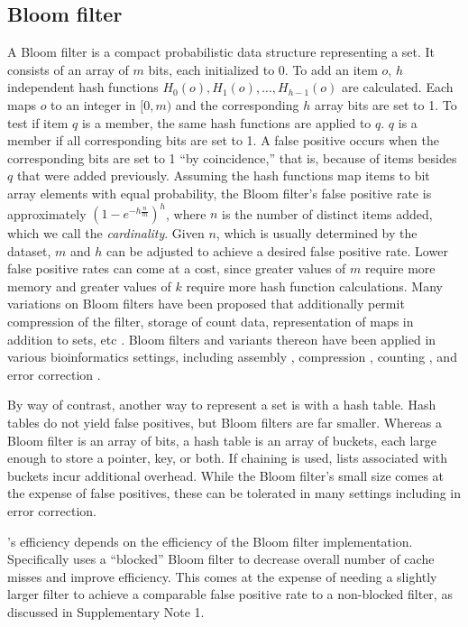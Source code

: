 \documentclass{bmcart}
\begin{document}
\subsection*{Bloom filter}
A Bloom filter \cite{bloom1970space} is a compact probabilistic data structure representing a set.  It consists of an array of $m$ bits, each initialized to 0.  To add an item $o$, $h$ independent hash functions $H_0(o), H_1(o),...,H_{h-1}(o)$ are calculated.  Each maps $o$ to an integer in $[0, m)$ and the corresponding $h$ array bits are set to 1. To test if item $q$ is a member, the same hash functions are applied to $q$.  $q$ is a member if all corresponding bits are set to 1.  A false positive occurs when the corresponding bits are set to 1 ``by coincidence,'' that is, because of items besides $q$ that were added previously.  Assuming the hash functions map items to bit array elements with equal probability, the Bloom filter's false positive rate is approximately $(1-e^{-h\frac{n}{m}})^h$, where $n$ is the number of distinct items added, which we call the \emph{cardinality}.  Given $n$, which is usually determined by the dataset, $m$ and $h$ can be adjusted to achieve a desired false positive rate.  Lower false positive rates can come at a cost, since greater values of $m$ require more memory and greater values of $k$ require more hash function calculations.  Many variations on Bloom filters have been proposed that additionally permit compression of the filter, storage of count data, representation of maps in addition to sets, etc \cite{tarkoma2012theory}.  Bloom filters and variants thereon have been applied in various bioinformatics settings, including assembly \cite{pell2012scaling}, compression \cite{jones2012compression}, \kmer counting \cite{melsted2011efficient}, and error correction \cite{shi2010parallel}.

By way of contrast, another way to represent a set is with a hash table.  Hash tables do not yield false positives, but Bloom filters are far smaller.  Whereas a Bloom filter is an array of bits, a hash table is an array of buckets, each large enough to store a pointer, key, or both.  If chaining is used, lists associated with buckets incur additional overhead.  While the Bloom filter's small size comes at the expense of false positives, these can be tolerated in many settings including in error correction.

\tool's efficiency depends on the efficiency of the Bloom filter implementation.  Specifically \tool uses a ``blocked'' Bloom filter to decrease overall number of cache misses and improve efficiency.  This comes at the expense of needing a slightly larger filter to achieve a comparable false positive rate to a non-blocked filter, as discussed in Supplementary Note 1.
\end{document}
